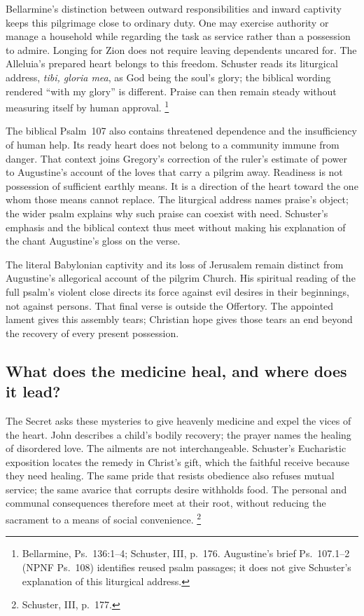 Bellarmine's distinction between outward responsibilities and inward
captivity keeps this pilgrimage close to ordinary duty. One may
exercise authority or manage a household while regarding the task
as service rather than a possession to admire. Longing for Zion
does not require leaving dependents uncared for. The Alleluia's
prepared heart belongs to this freedom. Schuster reads its liturgical
address, \emph{tibi, gloria mea}, as God being the soul's glory; the
biblical wording rendered ``with my glory'' is different. Praise can
then remain steady without measuring itself by human approval.
\footnote{Bellarmine, Ps.~136:1--4; Schuster, III, p.~176. Augustine's
brief Ps.~107.1--2 (NPNF Ps.~108) identifies reused psalm passages;
it does not give Schuster's explanation of this liturgical address.}

The biblical Psalm~107 also contains threatened dependence and the
insufficiency of human help. Its ready heart does not belong to a
community immune from danger. That context joins Gregory's correction
of the ruler's estimate of power to Augustine's account of the loves
that carry a pilgrim away. Readiness is not possession of sufficient
earthly means. It is a direction of the heart toward the one whom
those means cannot replace. The liturgical address names praise's
object; the wider psalm explains why such praise can coexist with
need. Schuster's emphasis and the biblical context thus meet without
making his explanation of the chant Augustine's gloss on the verse.

The literal Babylonian captivity and its loss of Jerusalem remain
distinct from Augustine's allegorical account of the pilgrim Church.
His spiritual reading of the full psalm's violent close directs its
force against evil desires in their beginnings, not against persons.
That final verse is outside the Offertory. The appointed lament
gives this assembly tears; Christian hope gives those tears an end
beyond the recovery of every present possession.

\subsection{What does the medicine heal, and where does it lead?}
The Secret asks these mysteries to give heavenly medicine and expel
the vices of the heart. John describes a child's bodily recovery;
the prayer names the healing of disordered love. The ailments are
not interchangeable. Schuster's Eucharistic exposition locates the
remedy in Christ's gift, which the faithful receive because they
need healing. The same pride that resists obedience also refuses
mutual service; the same avarice that corrupts desire withholds food.
The personal and communal consequences therefore meet at their root,
without reducing the sacrament to a means of social convenience.
\footnote{Schuster, III, p.~177.}


